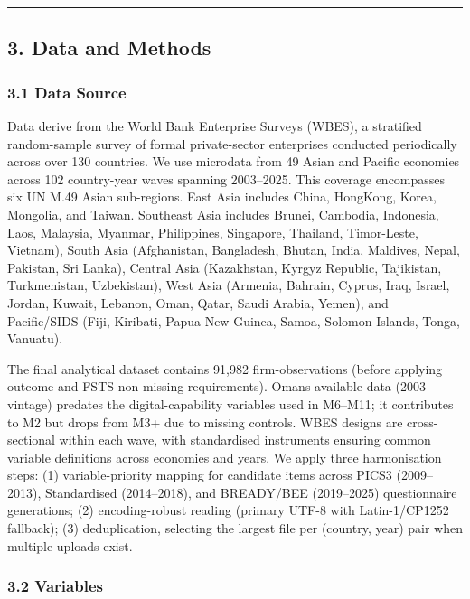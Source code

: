 \documentclass[12pt,a4paper]{article}
\begin{document}
\begin{center}\rule{0.5\linewidth}{0.5pt}\end{center}

\hypertarget{3-data-and-methods}{%
\subsection{3. Data and Methods}\label{3-data-and-methods}}

\hypertarget{31-data-source}{%
\subsubsection{3.1 Data Source}\label{31-data-source}}

Data derive from the World Bank Enterprise Surveys (WBES), a stratified
random-sample survey of formal private-sector enterprises conducted
periodically across over 130 countries. We use microdata from 49 Asian
and Pacific economies across 102 country-year waves spanning 2003--2025.
This coverage encompasses six UN M.49 Asian sub-regions. East Asia
includes China, HongKong, Korea, Mongolia, and Taiwan. Southeast Asia
includes Brunei, Cambodia, Indonesia, Laos, Malaysia, Myanmar,
Philippines, Singapore, Thailand, Timor-Leste, Vietnam), South Asia
(Afghanistan, Bangladesh, Bhutan, India, Maldives, Nepal, Pakistan, Sri
Lanka), Central Asia (Kazakhstan, Kyrgyz Republic, Tajikistan,
Turkmenistan, Uzbekistan), West Asia (Armenia, Bahrain, Cyprus, Iraq,
Israel, Jordan, Kuwait, Lebanon, Oman, Qatar, Saudi Arabia, Yemen), and
Pacific/SIDS (Fiji, Kiribati, Papua New Guinea, Samoa, Solomon Islands,
Tonga, Vanuatu).

The final analytical dataset contains 91,982 firm-observations (before
applying outcome and FSTS non-missing requirements).
Oman\textquotesingle s available data (2003 vintage) predates the
digital-capability variables used in M6--M11; it contributes to M2 but
drops from M3+ due to missing controls. WBES designs are cross-sectional
within each wave, with standardised instruments ensuring common variable
definitions across economies and years. We apply three harmonisation
steps: (1) variable-priority mapping for candidate items across PICS3
(2009--2013), Standardised (2014--2018), and BREADY/BEE (2019--2025)
questionnaire generations; (2) encoding-robust reading (primary UTF-8
with Latin-1/CP1252 fallback); (3) deduplication, selecting the largest
file per (country, year) pair when multiple uploads exist.

\hypertarget{32-variables}{%
\subsubsection{3.2 Variables}\label{32-variables}}
\end{document}
